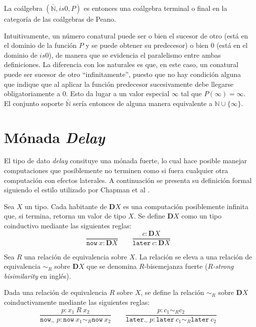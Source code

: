 La coálgebra $(\bar{\mathbb{N}},is0,P)$ es entonces una coálgebra terminal o final en la categoría de las coálgebras de Peano.  

Intuitivamente, un número conatural puede ser o bien el sucesor de otro (está en el dominio de la función $P$ y se puede obtener su predecesor) o bien $0$ (está en el dominio de $is0$), de manera que se evidencia el paralelismo entre ambas definiciones. La diferencia con los naturales es que, en este caso, un conatural puede ser sucesor de otro ``infinitamente'', puesto que no hay condición alguna que indique que al aplicar la función predecesor sucesivamente debe llegarse obligatoriamente a $0$. Esto da lugar a un valor especial $\infty$ tal que $P(\infty) = \infty$. El conjunto soporte $\bar{\mathbb{N}}$ sería entonces de alguna manera equivalente a $\mathbb{N} \cup \{\infty\}$. 


\section{Mónada \textit{Delay}}\label{delay:delay}

El tipo de dato \textit{delay} consituye una mónada fuerte, lo cual hace posible manejar computaciones que posiblemente no terminen como si fuera cualquier otra computación con efectos laterales. A continuación se presenta su definición formal siguiendo el estilo utilizado por Chapman et al \cite{chapman:2019}. 

\begin{definition}
Sea $X$ un tipo. Cada habitante de $\mathbf{D} X$ es una computación posiblemente infinita que, si termina, retorna un valor de tipo $X$. Se define $\mathbf{D} X$ como un tipo coinductivo mediante las siguientes reglas:
\begin{equation*}
\dfrac{}{\mathtt{now} \ x : \mathbf{D} X} 	\qquad  	\dfrac{c : \mathbf{D} X}{\mathtt{later} \ c : \mathbf{D} X}
\end{equation*}
\end{definition}

Sea $R$ una relación de equivalencia sobre $X$. La relación se eleva a una relación de equivalencia $\sim_R$ sobre $\mathbf{D}X$ que se denomina $R$-bisemejanza fuerte (\textit{$R$-strong bisimilarity} en inglés). 

\begin{definition}
Dada una relación de equivalencia $R$ sobre $X$, se define la relación $\sim_R$ sobre $\mathbf{D}X$ coinductivamente mediante las siguientes reglas:
\begin{equation*}
\dfrac{p : x_1 \ R \ x_2}{\mathtt{now}_{\sim} \ p : \mathtt{now} \ x_1 \sim_R \mathtt{now} \ x_2}  	\qquad  	\dfrac{p : c_1 \sim_R c_2}{\mathtt{later}_{\sim} \ p : \mathtt{later} \ c_1 \sim_R \mathtt{later} \ c_2}
\end{equation*}
\end{definition}


